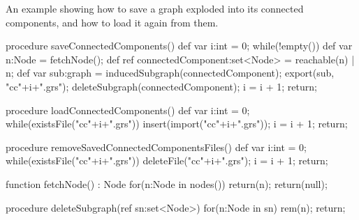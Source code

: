 \begin{example}
An example showing how to save a graph exploded into its connected components, and how to load it again from them.
\begin{grgen}
procedure saveConnectedComponents()
{
	def var i:int = 0;
	while(!empty()) {
		def var n:Node = fetchNode();
		def ref connectedComponent:set<Node> = reachable(n) | {n};
		def var sub:graph = inducedSubgraph(connectedComponent);
		export(sub, "cc"+i+".grs");
		deleteSubgraph(connectedComponent);
		i = i + 1;
	}
	return;
}

procedure loadConnectedComponents()
{
	def var i:int = 0;
	while(existsFile("cc"+i+".grs")) {
		insert(import("cc"+i+".grs"));
		i = i + 1;
	}
	return;
}

procedure removeSavedConnectedComponentsFiles()
{
	def var i:int = 0;
	while(existsFile("cc"+i+".grs")) {
		deleteFile("cc"+i+".grs");
		i = i + 1;
	}
	return;
}

function fetchNode() : Node
{
	for(n:Node in nodes()) {
		return(n);
	}
	return(null);
}

procedure deleteSubgraph(ref sn:set<Node>)
{
	for(n:Node in sn) {
		rem(n);
	}
	return;
}
\end{grgen}
\end{example}


